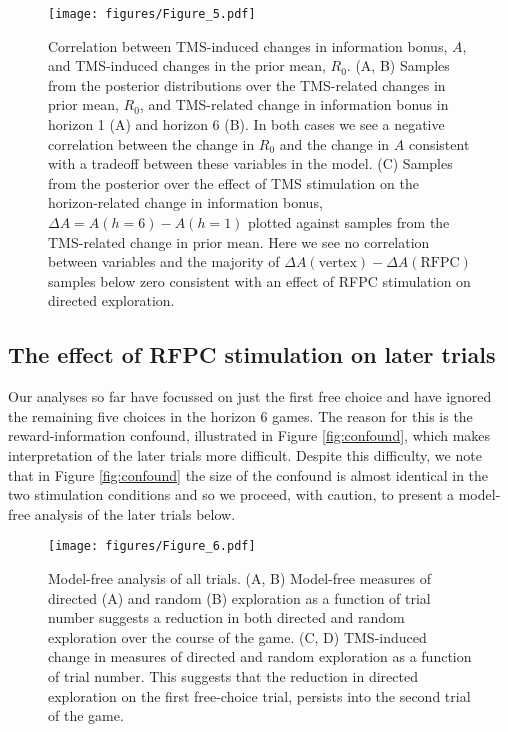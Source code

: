 \documentclass[12pt]{article}
\begin{document}
\begin{figure}[thp]
\begin{center}
		\texttt{[image: figures/Figure\_5.pdf]}
\caption{\color{red} Correlation between TMS-induced changes in information bonus, $A$, and TMS-induced changes in the prior mean, $R_0$.  (A, B) Samples from the posterior distributions over the TMS-related changes in prior mean, $R_0$, and TMS-related change in information bonus in horizon 1 (A) and horizon 6 (B).  In both cases we see a negative correlation between the change in $R_0$ and the change in $A$ consistent with a tradeoff between these variables in the model.  (C)  Samples from the posterior over the effect of TMS stimulation on the horizon-related change in information bonus, $\Delta A = A(h = 6) - A(h = 1)$ plotted against samples from the TMS-related change in prior mean.  Here we see no correlation between variables and the majority of $\Delta A(\mbox{vertex}) - \Delta A(\mbox{RFPC})$ samples below zero consistent with an effect of RFPC stimulation on directed exploration.}
\label{fig:mb2}
\end{center}
\end{figure}


\subsection*{The effect of RFPC stimulation on later trials}
Our analyses so far have focussed on just the first free choice and have ignored the remaining five choices in the horizon 6 games. The reason for this is the reward-information confound, illustrated in Figure \ref{fig:confound}, which makes interpretation of the later trials more difficult. Despite this difficulty, we note that in Figure \ref{fig:confound} the size of the confound is almost identical in the two stimulation conditions and so we proceed, with caution, to present a model-free analysis of the later trials below. 

\begin{figure}[th]
\begin{center}
		\texttt{[image: figures/Figure\_6.pdf]}
\caption{Model-free analysis of all trials. (A, B) Model-free measures of directed (A) and random (B) exploration as a function of trial number suggests a reduction in both directed and random exploration over the course of the game.  (C, D) TMS-induced change in measures of directed and random exploration as a function of trial number. This suggests that the reduction in directed exploration on the first free-choice trial, persists into the second trial of the game.}
\label{fig:later}
\end{center}
\end{figure}
\end{document}
